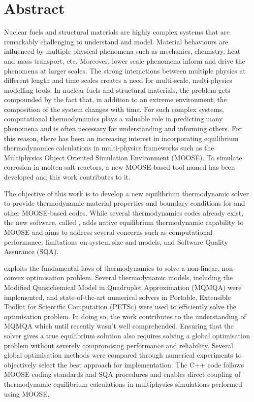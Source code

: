 \chapter*{Abstract}

Nuclear fuels and structural materials are highly complex systems that are remarkably challenging to understand and model. Material behaviours are influenced by multiple physical phenomena such as mechanics, chemistry, heat and mass transport, etc. Moreover, lower scale phenomena inform and drive the phenomena at larger scales. The strong interactions between multiple physics at different length and time scales creates a need for multi-scale, multi-physics modelling tools. In nuclear fuels and structural materials, the problem gets compounded by the fact that, in addition to an extreme environment, the composition of the system changes with time. For such complex systems, computational thermodynamics plays a valuable role in predicting many phenomena and is often necessary for understanding and informing others. For this reason, there has been an increasing interest in incorporating equilibrium thermodynamics calculations in multi-physics frameworks such as the Multiphysics Object Oriented Simulation Environment (MOOSE). To simulate corrosion in molten salt reactors, a new MOOSE-based tool named {\YJ} has been developed and this work contributes to it.

The objective of this work is to develop a new equilibrium thermodynamic solver to provide thermodynamic material properties and boundary conditions for {\YJ} and other MOOSE-based codes. While several thermodynamics codes already exist, the new software, called {\GEM}, adds native equilibrium thermodynamic capability to MOOSE and aims to address several concerns such as computational performance, limitations on system size and models, and Software Quality Assurance (SQA).

{\GEM} exploits the fundamental laws of thermodynamics to solve a non-linear, non-convex optimisation problem. Several thermodynamic models, including the Modified Quasichemical Model in Quadruplet Approximation (MQMQA) were implemented, and state-of-the-art numerical solvers in Portable, Extensible Toolkit for Scientific Computation (PETSc) were used to efficiently solve the optimisation problem. In doing so, the work contributes to the understanding of MQMQA which until recently wasn't well comprehended. Ensuring that the solver gives a true equilibrium solution also requires solving a global optimisation problem without severely compromising performance and reliability. Several global optimisation methods were compared through numerical experiments to objectively select the best approach for implementation. The C++ code follows MOOSE coding standards and SQA procedures and enables direct coupling of thermodynamic equilibrium calculations in multiphysics simulations performed using MOOSE. 


